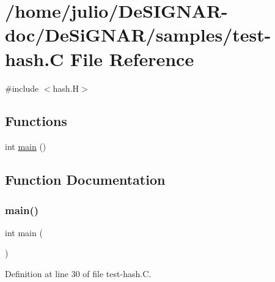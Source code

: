 \hypertarget{test-hash_8_c}{}\section{/home/julio/\+De\+S\+I\+G\+N\+A\+R-\/doc/\+De\+Si\+G\+N\+A\+R/samples/test-\/hash.C File Reference}
\label{test-hash_8_c}
{\ttfamily \#include $<$hash.\+H$>$}\newline
\subsection*{Functions}
\begin{DoxyCompactItemize}
\item 
int \hyperlink{test-hash_8_c_ae66f6b31b5ad750f1fe042a706a4e3d4}{main} ()
\end{DoxyCompactItemize}


\subsection{Function Documentation}
\mbox{\label{test-hash_8_c_ae66f6b31b5ad750f1fe042a706a4e3d4}} 
\subsubsection{\texorpdfstring{main()}{main()}}
{\footnotesize\ttfamily int main (\begin{DoxyParamCaption}{ }\end{DoxyParamCaption})}



Definition at line 30 of file test-\/hash.\+C.

